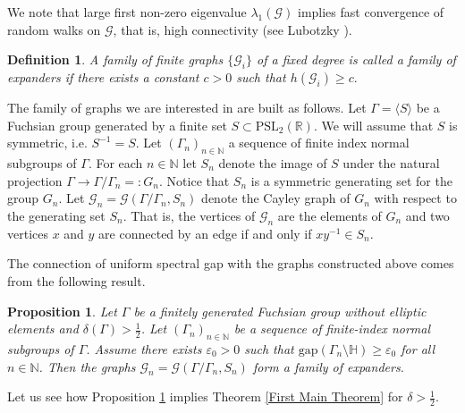 \documentclass[12pt]{article}
\newtheorem{prop}[thm]{Proposition}
\newtheorem{defi}[thm]{Definition}
\newcommand{\RR}{\mathbb{R}}
\newcommand{\NN}{\mathbb{N}}
\newcommand{\HH}{\mathbb{H}}
\begin{document}
We note that large first non-zero eigenvalue $ \lambda_{1}(\mathcal{G}) $ implies fast convergence of random walks on $ \mathcal{G} $, that is, high connectivity (see Lubotzky \cite{Lubotzky2}).

\begin{defi}
A family of finite graphs $ \{ \mathcal{G}_{i} \} $ of a fixed degree is called a family of expanders if there exists a constant $ c>0 $ such that $ h(\mathcal{G}_{i})\geq c. $
\end{defi}

The family of graphs we are interested in are built as follows. Let $ \Gamma=\langle S\rangle $ be a Fuchsian group generated by a finite set $ S\subset \mathrm{PSL}_{2}(\RR) $. We will assume that $ S $ is symmetric, i.e. $ S^{-1}=S. $ Let $ (\Gamma_{n})_{n\in \mathbb{N}} $ a sequence of finite index normal subgroups of $ \Gamma $. For each $ n\in \mathbb{N} $ let $ S_{n} $ denote the image of $ S $ under the natural projection $ \Gamma\to \Gamma/\Gamma_{n}=: G_{n} $. Notice that $ S_{n} $ is a symmetric generating set for the group $ G_{n} $. Let $ \mathcal{G}_{n} = \mathcal{G}(\Gamma/\Gamma_{n}, S_{n}) $ denote the Cayley graph of $ G_{n} $ with respect to the generating set $ S_{n} $. That is, the vertices of $ \mathcal{G}_{n} $ are the elements of $ G_{n} $ and two vertices $ x $ and $ y $ are connected by an edge if and only if $ xy^{-1}\in S_{n}. $

The connection of uniform spectral gap with the graphs constructed above comes from the following result.

\begin{prop}\label{expanders and gap}
Let $ \Gamma $ be a finitely generated Fuchsian group without elliptic elements and $ \delta(\Gamma) > \frac{1}{2} $. Let $ (\Gamma_{n})_{n\in \NN} $ be a sequence of finite-index normal subgroups of $ \Gamma $. Assume there exists $ \varepsilon_{0} > 0 $ such that $ \mathrm{gap}(\Gamma_{n}\setminus \HH) \geq \varepsilon_{0} $ for all $ n\in \NN $. Then the graphs $ \mathcal{G}_{n} = \mathcal{G}(\Gamma/\Gamma_{n}, S_{n}) $ form a family of expanders.
\end{prop}



Let us see how Proposition \ref{expanders and gap} implies Theorem \ref{First Main Theorem} for $ \delta > \frac{1}{2} $.
\end{document}
